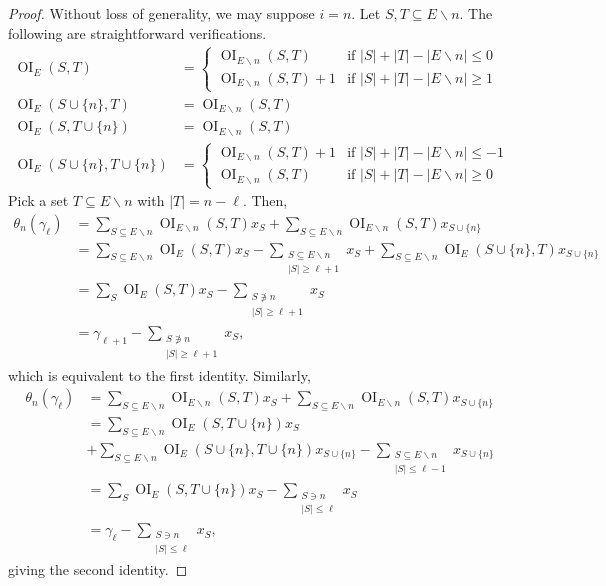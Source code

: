 \documentclass[ALCO,published]{cedram}
\numberwithin{equation}{section}
\numberwithin{figure}{section}
\DeclareMathOperator{\OI}{OI}
\begin{document}
\begin{proof}
Without loss of generality, we may suppose $i=n$.
Let $S,T\subseteq E\backslash n$. The following are straightforward verifications.
\begin{align*}
  \OI_{E}(S,T)&=
  \begin{cases}
    \OI_{E\backslash n}(S,T) &\text{if }|S|+|T|-|E\backslash n|\leq 0\\
    \OI_{E\backslash n}(S,T)+1 &\text{if }|S|+|T|-|E\backslash n|\geq 1      
  \end{cases}\\
  \OI_{E}(S\cup\{n\},T)&=\OI_{E\backslash n}(S,T)\\
  \OI_{E}(S,T\cup\{n\})&=\OI_{E\backslash n}(S,T)\\
  \OI_{E}(S\cup\{n\},T\cup\{n\})&=
  \begin{cases}
    \OI_{E\backslash n}(S,T)+1 &\text{if }|S|+|T|-|E\backslash n|\leq -1\\
    \OI_{E\backslash n}(S,T)   &\text{if }|S|+|T|-|E\backslash n|\geq 0      
  \end{cases}
\end{align*}
Pick a set $T\subseteq E\backslash n$ with $|T|=n-\ell$. Then,
\begin{align*}
\theta_n(\gamma_{\ell})&=\sum_{S\subseteq E \backslash n} \OI_{E\backslash n}(S,T)x_S+\sum_{S\subseteq E\backslash n}\OI_{E\backslash n}(S,T)x_{S\cup \{n\}}\\
&=\sum_{S\subseteq E\backslash n} \OI_{E}(S,T)x_S-\sum_{\substack{S\subseteq E\backslash n\\|S|\geq\ell+1}}x_S+\sum_{S\subseteq E\backslash n}\OI_{E}(S\cup\{n\},T)x_{S\cup\{n\}}\\
&=\sum_S\OI_{E}(S,T)x_S-\sum_{\substack{S\not\ni n\\|S|\geq \ell+1}}x_S\\
&=\gamma_{\ell+1}-\sum_{\substack{S\not\ni n\\|S|\geq \ell+1}}x_S,
\end{align*}
which is equivalent to the first identity.
Similarly, 
\begin{align*}
\theta_n(\gamma_{\ell})&=\sum_{S\subseteq E\backslash n} \OI_{E\backslash n}(S,T)x_S+\sum_{S\subseteq E\backslash n}\OI_{E\backslash n}(S,T)x_{S\cup \{n\}}\\
&=\sum_{S\subseteq E\backslash n} \OI_{E}(S,T\cup\{n\})x_S\\
& +\sum_{S\subseteq E\backslash n}\OI_{E}(S\cup\{n\},T\cup\{n\})x_{S\cup\{n\}}-\sum_{\substack{S\subseteq E\backslash n\\|S|\leq\ell-1}}x_{S\cup\{n\}}\\
&=\sum_S\OI_{E}(S,T\cup\{n\})x_S-\sum_{\substack{S\ni n\\|S|\leq \ell}}x_S\\
&=\gamma_{\ell}-\sum_{\substack{S\ni n\\|S|\leq \ell}}x_S,
\end{align*}
giving the second identity.
\end{proof}
\end{document}
